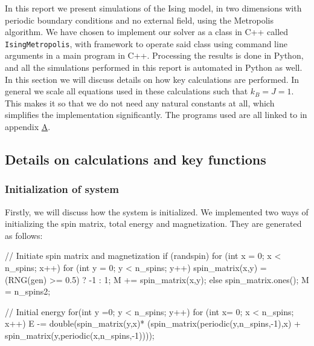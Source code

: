\documentclass[reprint,english,notitlepage]{revtex4-1}  %
\begin{document}
In this report we present simulations of the Ising model, in two dimensions with periodic boundary conditions and no external field, using the Metropolis algorithm. We have chosen to implement our solver as a class in C++ called \verb+IsingMetropolis+, with framework to operate said class using command line arguments in a main program in C++. Processing the results is done in Python, and all the simulations performed in this report is automated in Python as well. In this section we will discuss details on how key calculations are performed. In general we scale all equations used in these calculations such that $k_B = J = 1$. This makes it so that we do not need any natural constants at all, which simplifies the implementation significantly. The programs used are all linked to in appendix \hyperref[A]{A}.

\subsection{Details on calculations and key functions} \label{sec:III:a}

\subsubsection{Initialization of system} \label{sec:III:a:i}

Firstly, we will discuss how the system is initialized. We implemented two ways of initializing the spin matrix, total energy and magnetization. They are generated as follows:

\begin{cpp}
// Initiate spin matrix and magnetization
if (randspin) {
  for (int x = 0; x < n_spins; x++) {
    for (int y = 0; y < n_spins; y++) {
      spin_matrix(x,y) = (RNG(gen) >= 0.5) ? -1 : 1;
      M += spin_matrix(x,y);
    }
  }
} else {
  spin_matrix.ones();
  M = n_spins2;
}


// Initial energy
for(int y =0; y < n_spins; y++) {
  for (int x= 0; x < n_spins; x++){
    E -=  double(spin_matrix(y,x)*
          (spin_matrix(periodic(y,n_spins,-1),x) +
          spin_matrix(y,periodic(x,n_spins,-1))));
  }
}
\end{cpp}
\end{document}

